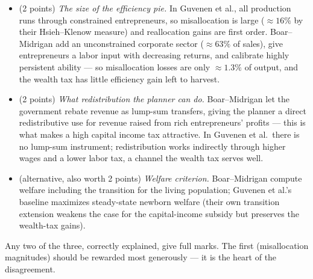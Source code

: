 \begin{parts}
    \begin{solutionorbox}[12cm]
        \begin{itemize}
            \item (2 points) \emph{The size of the efficiency pie.} In Guvenen et al., all production runs through constrained entrepreneurs, so misallocation is large ($\approx 16\%$ by their Hsieh--Klenow measure) and reallocation gains are first order. Boar--Midrigan add an unconstrained corporate sector ($\approx 63\%$ of sales), give entrepreneurs a labor input with decreasing returns, and calibrate highly persistent ability — so misallocation losses are only $\approx 1.3\%$ of output, and the wealth tax has little efficiency gain left to harvest.
            \item (2 points) \emph{What redistribution the planner can do.} Boar--Midrigan let the government rebate revenue as lump-sum transfers, giving the planner a direct redistributive use for revenue raised from rich entrepreneurs' profits — this is what makes a high capital income tax attractive. In Guvenen et al.\ there is no lump-sum instrument; redistribution works indirectly through higher wages and a lower labor tax, a channel the wealth tax serves well.
            \item (alternative, also worth 2 points) \emph{Welfare criterion.} Boar--Midrigan compute welfare including the transition for the living population; Guvenen et al.'s baseline maximizes steady-state newborn welfare (their own transition extension weakens the case for the capital-income subsidy but preserves the wealth-tax gains).
        \end{itemize}
        Any two of the three, correctly explained, give full marks. The first (misallocation magnitudes) should be rewarded most generously — it is the heart of the disagreement.
    \end{solutionorbox}
\end{parts}
